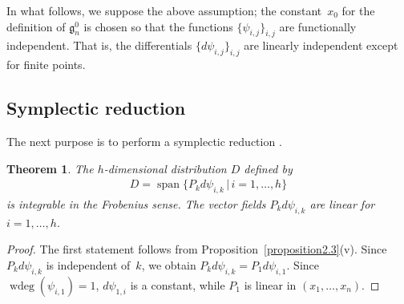 \documentclass[10pt,a4paper]{amsart}
\numberwithin{equation}{section}
\newtheorem{Theorem}{Theorem}[section]
\begin{document}
In what follows, we suppose the above assumption; the constant~$x_0$ for the def\/inition of $\mathfrak{g}^0_n$ is chosen so that the functions $\{ \psi_{i,j}\}_{i,j}$ are functionally independent. That is, the dif\/ferentials $\{ d\psi_{i,j}\}_{i,j}$ are linearly independent except for f\/inite points.

\subsection{Symplectic reduction}\label{section2.3}

The next purpose is to perform a symplectic reduction \cite{Mag1, Mag2, Mag3, Mag4}.


\begin{Theorem}\label{theorem2.5}
The $h$-dimensional distribution $D$ defined by
\begin{gather*}
D = \operatorname{span}\{ P_kd\psi_{i,k} \, | \, i=1,\dots ,h\}
\end{gather*}
is integrable in the Frobenius sense. The vector fields $P_k d\psi_{i,k}$ are linear for $i=1, \dots ,h$.
\end{Theorem}



\begin{proof}The f\/irst statement follows from Proposition~\ref{proposition2.3}(v). Since $P_kd\psi_{i,k}$ is independent of~$k$, we obtain $P_kd\psi_{i,k}=P_1d\psi_{i,1}$. Since $\operatorname{wdeg}(\psi_{i,1}) = 1$, $d\psi_{1,i}$ is a constant, while $P_1$ is linear in $(x_1,\dots ,x_n)$.
\end{proof}
\end{document}
